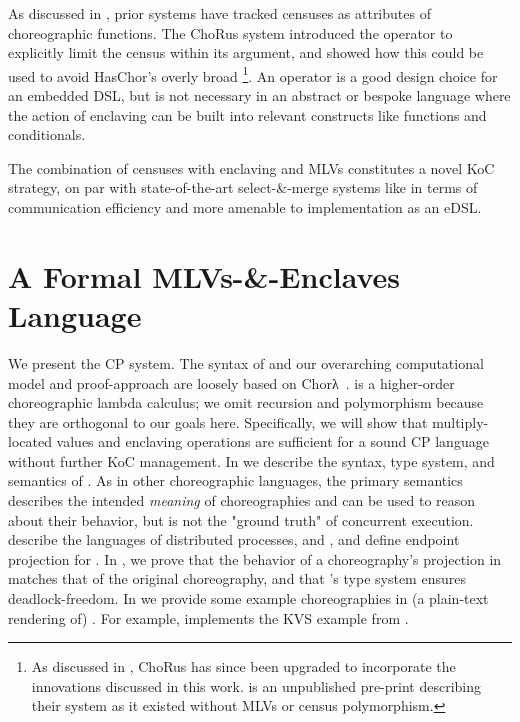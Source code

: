 As discussed in , prior systems have tracked censuses as attributes of choreographic functions.
The ChoRus system introduced the  operator to explicitly limit the census within its argument,
and showed how this could be used to avoid HasChor's overly broad \footnote{
	As discussed in \cite{batesenclaves}, ChoRus has since been upgraded to incorporate
	the innovations discussed in this work.
	\cite{chorus} is an unpublished pre-print describing their system as it existed without MLVs or census polymorphism.

}.
An  operator is a good design choice for an embedded DSL,
but is not necessary in an abstract or bespoke language where the action of enclaving can be built into relevant constructs like
functions and conditionals.

The combination of censuses with enclaving and MLVs constitutes a novel KoC strategy,
on par with state-of-the-art select-\&-merge systems like \chorLambda in terms of communication efficiency
and more amenable to implementation as an eDSL.


\section{A Formal MLVs-\&-Enclaves Language}\label{sec:more-formalism}

We present the \HLSCentral CP system.
The syntax of \HLSCentral and our overarching computational model and proof-approach are loosely based on
Chorλ~\cite{chor-lambda}.
\HLSCentral is a higher-order choreographic lambda calculus;
we omit recursion and polymorphism because they are orthogonal to our goals here.
Specifically, we will show that multiply-located values and enclaving operations are sufficient for a sound
CP language without further KoC management.
In 
we describe the syntax, type system, and semantics of \HLSCentral.
As in other choreographic languages, the primary semantics describes the intended \emph{meaning} of choreographies
and can be used to reason about their behavior,
but is not the "ground truth" of concurrent execution.
 describe the languages of distributed processes,
\HLSLocal and \HLSNet,
and define endpoint projection for \HLSCentral.
%
In , we prove that the behavior of a choreography's projection in \HLSNet
matches that of the original \HLSCentral choreography, and that \HLSCentral's type system ensures deadlock-freedom.
In  we provide some example choreographies in (a plain-text rendering of) \HLSCentral.
For example,  implements the KVS example from .

